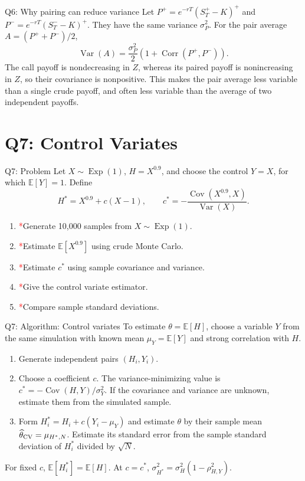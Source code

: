 \documentclass{beamer}
\newcommand{\E}{\mathbb E}
\newcommand{\Var}{\operatorname{Var}}
\newcommand{\Cov}{\operatorname{Cov}}
\newcommand{\redstar}{\textcolor{red}{*}}
\begin{document}
\begin{frame}{Q6: Why pairing can reduce variance}
\small
Let $P^+=e^{-rT}(S_T^+-K)^+$ and
$P^-=e^{-rT}(S_T^--K)^+$. They have the same variance $\sigma_P^2$.
For the pair average $A=(P^++P^-)/2$,
\[
\Var(A)=\frac{\sigma_P^2}{2}
\left(1+\operatorname{Corr}(P^+,P^-)\right).
\]
The call payoff is nondecreasing in $Z$, whereas its paired payoff is
nonincreasing in $Z$, so their covariance is nonpositive. This makes
the pair average less variable than a single crude payoff, and often
less variable than the average of two independent payoffs.
\end{frame}

\section[Q7]{Q7: Control Variates}

\begin{frame}{Q7: Problem}
\small
Let $X\sim\operatorname{Exp}(1)$, $H=X^{0.9}$, and choose the control
$Y=X$, for which $\E[Y]=1$. Define
\[
H^*=X^{0.9}+c(X-1),
\qquad c^*=-\frac{\Cov(X^{0.9},X)}{\Var(X)}.
\]
\begin{enumerate}
\item[(a)] \redstar Generate 10,000 samples from $X\sim \operatorname{Exp}(1)$.
\item[(b)] \redstar Estimate $\E[X^{0.9}]$ using crude Monte Carlo.
\item[(c)] \redstar Estimate $c^*$ using sample covariance and variance.
\item[(d)] \redstar Give the control variate estimator.
\item[(e)] \redstar Compare sample standard deviations.
\end{enumerate}
\end{frame}

\begin{frame}{Q7: Algorithm: Control variates}
\small
To estimate $\theta=\E[H]$, choose a variable $Y$ from the same simulation
with known mean $\mu_Y=\E[Y]$ and strong correlation with $H$.
\begin{enumerate}
\item Generate independent pairs $(H_i,Y_i)$.
\item Choose a coefficient $c$. The variance-minimizing value is
      $c^*=-\Cov(H,Y)/\sigma_Y^2$. If the covariance and variance are unknown,
      estimate them from the simulated sample.
\item Form $H_i^*=H_i+c(Y_i-\mu_Y)$ and estimate $\theta$ by their sample mean
      $\widehat\theta_{\rm CV}=\mu_{H^*,N}$. Estimate its standard error from
      the sample standard deviation of $H_i^*$ divided by $\sqrt N$.
\end{enumerate}
For fixed $c$, $\E[H_i^*]=\E[H]$. At $c=c^*$,
$\sigma_{H^*}^2=\sigma_H^2(1-\rho_{H,Y}^2)$.
\end{frame}
\end{document}
